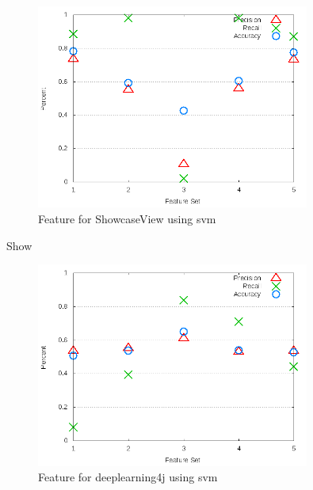 \begin{figure}[!t]
    \centering

        \includegraphics[width=0.8\textwidth]{images/svm/test_3/ShowcaseView_sample_range}
        \caption{Feature for ShowcaseView using \gls{svm}}
        \label{fig:test_3_ShowcaseView_svm}
\end{figure}

Show

\begin{figure}[!ht]
    \centering
        \includegraphics[width=0.8\textwidth]{images/svm/test_3/deeplearning4j_sample_range}
    \caption{Feature for deeplearning4j using \gls{svm}}
    \label{fig:test_3_deeplearning4j_svm}
\end{figure}

